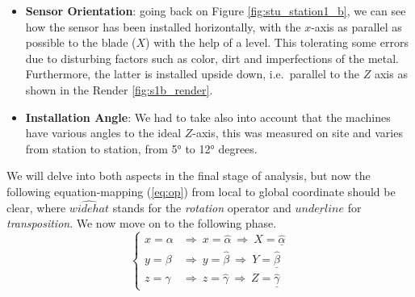 \begin{itemize}
    \item \textbf{Sensor Orientation}: 
    going back on Figure \ref{fig:stu_station1_b}, we can see how the sensor has been installed horizontally, with the $x$-axis as parallel as possible to the blade ($X$) with 
    the help of a level.  This tolerating some errors due to disturbing factors such as color, dirt and imperfections of the metal.
    Furthermore, the latter is installed upside down, i.e.\ parallel to the $Z$ axis as shown in the Render \ref{fig:s1b_render}.
    \item \textbf{Installation Angle}:
    We had to take also into account that the machines have various angles to the ideal $Z$-axis, this was measured on site and varies from station to station, from 5° to 12° degrees.
\end{itemize}
We will delve into both aspects in the final stage of analysis, but now the following equation-mapping (\ref{eq:op}) from local to global coordinate should be clear, 
where $\widehat{widehat}$ stands for the \textit{rotation} operator and $\underline{underline}$ for \textit{transposition}. We now move on to the following phase.
\begin{equation}
    \left\{ \begin{array}{cl}
        x = \alpha & \Rightarrow  \ x = \widehat{\alpha} \ \Rightarrow  \ X = \underline{\widehat{\alpha}} \\
        y = \beta & \Rightarrow  \ y = \widehat{\beta} \ \Rightarrow  \ Y = \underline{\widehat{\beta}} \\ 
        z = \gamma & \Rightarrow  \ z = \widehat{\gamma} \ \Rightarrow  \ Z = \underline{\widehat{\gamma}}
        \end{array} \right.
    \label{eq:op}
\end{equation}

